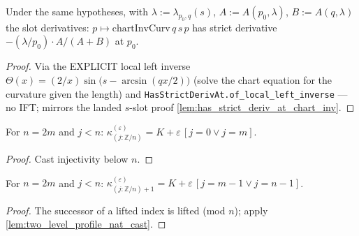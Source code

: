 \begin{lemma}
  \label{lem:has_strict_deriv_at_chart_inv_curv}
  Under the same hypotheses, with $\lambda := \lambda_{p_0,q}(s)$, $A :=
  A(p_0, \lambda)$, $B := A(q, \lambda)$ the slot derivatives:
  $p \mapsto \mathrm{chartInvCurv}\,q\,s\,p$ has strict derivative
  $-(\lambda/p_0)\cdot A/(A+B)$ at $p_0$.
\end{lemma}
\begin{proof}

\leanok
  Via the EXPLICIT local left inverse
  $\Theta(x) = (2/x)\sin\bigl(s - \arcsin(qx/2)\bigr)$ (solve the chart
  equation for the curvature given the length) and
  \texttt{HasStrictDerivAt.of\_local\_left\_inverse} --- no IFT; mirrors the
  landed $s$-slot proof \cref{lem:has_strict_deriv_at_chart_inv}.
\end{proof}

\begin{lemma}
  \label{lem:two_level_profile_nat_cast}
  For $n = 2m$ and $j < n$:
  $\kappa^{(\varepsilon)}_{(j : \mathbb{Z}/n)} = K + \varepsilon\,
  [j = 0 \lor j = m]$.
\end{lemma}
\begin{proof}

\leanok
  Cast injectivity below $n$.
\end{proof}

\begin{lemma}
  \label{lem:two_level_profile_nat_cast_succ}
  For $n = 2m$ and $j < n$:
  $\kappa^{(\varepsilon)}_{(j : \mathbb{Z}/n) + 1} = K + \varepsilon\,
  [j = m - 1 \lor j = n - 1]$.
\end{lemma}
\begin{proof}

\leanok
  The successor of a lifted index is lifted (mod $n$); apply
  \cref{lem:two_level_profile_nat_cast}.
\end{proof}

